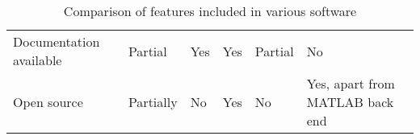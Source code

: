\begin{table}[H]
{{\begin{tabular}{C{2.5cm} | C{3cm} C{3cm} C{3cm} C{3cm} C{3cm} }
                            Documentation available     & Partial                           & Yes                                           & Yes            & Partial       & No                                              \\
                            Open source                 & Partially                         & No                                            & Yes            & No            & {\small Yes, apart from MATLAB back end}                 \\
                        \end{tabular}}}
                        \caption{Comparison of features included in various software}\label{table:features}
                    \end{table}

            